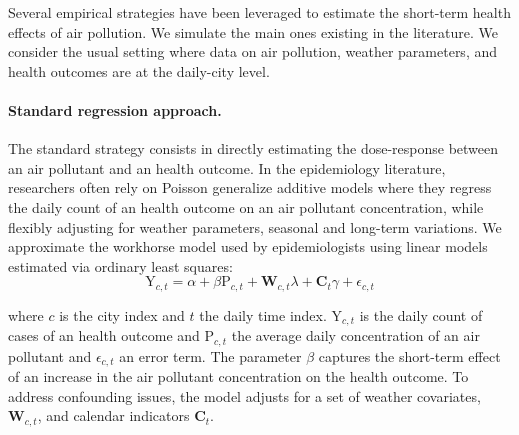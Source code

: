 \documentclass[12pt]{article}
\begin{document}
        Several empirical strategies have been leveraged to estimate the short-term health effects of air pollution. We simulate the main ones existing in the literature. We consider the usual setting where data on air pollution, weather parameters, and health outcomes are at the daily-city level.
        
        \begin{sloppypar}
        \paragraph{Standard regression approach.} The standard strategy consists in directly estimating the dose-response between an air pollutant and an health outcome. In the epidemiology literature, researchers often rely on Poisson generalize additive models where they regress the daily count of an health outcome on an air pollutant concentration, while flexibly adjusting for weather parameters, seasonal and long-term variations. We approximate the workhorse model used by epidemiologists using linear models estimated via ordinary least squares:
        ~
        \begin{equation*}
            \text{Y}_{c,t} = \alpha + \beta\text{P}_{c,t} + \textbf{W}_{c,t}\lambda + \textbf{C}_{t}\gamma + \epsilon_{c,t}
        \end{equation*}
        \end{sloppypar}
        
        \noindent where $c$ is the city index and $t$ the daily time index. $\text{Y}_{c,t}$ is the daily count of cases of an health outcome and $\text{P}_{c,t}$ the average daily concentration of an air pollutant and $\epsilon_{c,t}$ an error term. The parameter $\beta$ captures the short-term effect of an increase in the air pollutant concentration on the health outcome. To address confounding issues, the model adjusts for a set of weather covariates,  $\textbf{W}_{c,t}$, and calendar indicators $\textbf{C}_{t}$. 
        
\end{document}
